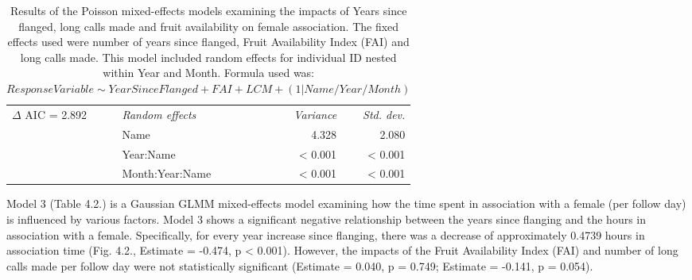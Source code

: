 \begin{table}
{\begin{tabular}{l l r r r r}
        \cline{2-6}
      $\Delta$ AIC = 2.892 & \textit{Random effects} & & & \textit{Variance} & \textit{Std. dev.} \\
        \cline{2-6} 
        & Name & & & 4.328 & 2.080 \\
        & Year:Name & & & < 0.001 & < 0.001 \\
        & Month:Year:Name & & & < 0.001 & < 0.001 \\
        \hline
    \end{tabular}
    }
    \caption{Results of the Poisson mixed-effects models examining the impacts of Years since flanged, long calls made and fruit availability on female association. The fixed effects used were number of years since flanged, Fruit Availability Index (FAI) and long calls made. This model included random effects for individual ID nested within Year and Month.
    Formula used was: \(ResponseVariable \sim YearSinceFlanged + FAI + LCM + (1 |Name/Year/Month)\) }
\end{table}
Model 3 (Table 4.2.) is a Gaussian GLMM mixed-effects model examining how the time spent in association with a female (per follow day) is influenced by various factors. Model 3 shows a significant negative relationship between the years since flanging and the hours in association with a female. Specifically, for every year increase since flanging, there was a decrease of approximately 0.4739 hours in association time (Fig. 4.2., Estimate = -0.474, p < 0.001). However, the impacts of the Fruit Availability Index (FAI) and number of long calls made per follow day were not statistically significant (Estimate = 0.040,  p = 0.749; Estimate = -0.141, p = 0.054). 
